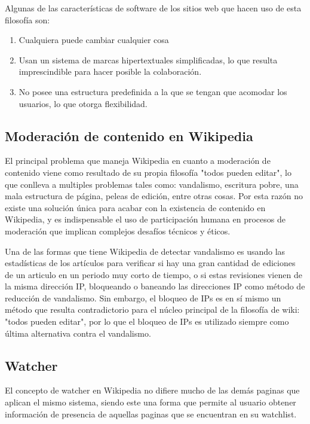         Algunas de las características de software de los sitios web que hacen uso de esta filosofía son: 
    
        \begin{enumerate}
            \item Cualquiera puede cambiar cualquier cosa
            \item Usan un sistema de marcas hipertextuales simplificadas, lo que resulta imprescindible para hacer posible la colaboración.
            \item No posee una estructura predefinida a la que se tengan que acomodar los usuarios, lo que otorga flexibilidad.
        \end{enumerate}

    \subsection{Moderación de contenido en Wikipedia}

        El principal problema que maneja Wikipedia en cuanto a moderación de contenido viene como resultado de su propia filosofía "todos pueden editar", lo que conlleva a multiples problemas tales como: vandalismo, escritura pobre, una mala estructura de página, peleas de edición, entre otras cosas. Por esta razón no existe una solución única para acabar con la existencia de  contenido en Wikipedia, y es indispensable el uso de participación humana en procesos de moderación que implican complejos desafíos técnicos y éticos.

        Una de las formas que tiene Wikipedia de detectar vandalismo es usando las estadísticas de los artículos para verificar si hay una gran cantidad de ediciones de un articulo en un periodo muy corto de tiempo, o si estas revisiones vienen de la misma dirección IP, bloqueando o baneando las direcciones IP como método de reducción de vandalismo. Sin embargo, el bloqueo de IPs es en sí mismo un método que resulta contradictorio para el núcleo principal de la filosofía de wiki: "todos pueden editar", por lo que el bloqueo de IPs es utilizado siempre como última alternativa contra el vandalismo.

        
    \subsection{Watcher}
        
        El concepto de watcher en Wikipedia no difiere mucho de las demás paginas que aplican el mismo sistema, siendo este una forma que permite al usuario obtener información de presencia de aquellas paginas que se encuentran en su watchlist.


